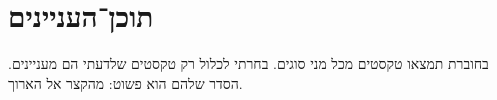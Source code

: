 \section*{תוכן־העניינים}

בחוברת תמצאו טקסטים מכל מני סוגים. בחרתי לכלול רק טקסטים שלדעתי הם מעניינים. הסדר שלהם הוא פשוט: מהקצר אל הארוך.

\tableofcontents
